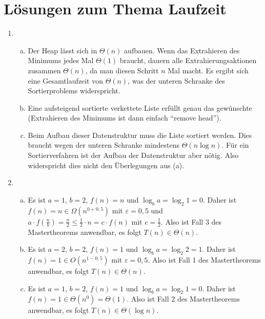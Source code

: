 \documentclass{scrartcl}
\begin{document}
\section*{Lösungen zum Thema Laufzeit}
\begin{enumerate}[(1)]

\item \begin{enumerate}[(a)]
\item Der Heap l\"asst sich in $\Theta(n)$ aufbauen. Wenn das Extrahieren des Minimums jedes Mal $\Theta(1)$ braucht, dauern alle Extrahierungsaktionen zusammen $\Theta(n)$, da man diesen Schritt $n$ Mal macht. Es ergibt sich eine Gesamtlaufzeit von $\Theta(n)$, was der unteren Schranke des Sortierproblems widerspricht.
\item Eine aufsteigend sortierte verkettete Liste erf\"ullt genau das gew\"unschte (Extrahieren des Minimums ist dann einfach "`remove head"').
\item Beim Aufbau dieser Datenstruktur muss die Liste sortiert werden. Dies braucht wegen der unteren Schranke mindestens $\Theta(n\log n)$. F\"ur ein Sortierverfahren ist der Aufbau der Datenstruktur aber n\"otig. Also widerspricht dies nicht den \"Uberlegungen aus (a).
\end{enumerate}

\item \begin{enumerate}[(a)]
\item Es ist $a=1$, $b=2$, $f(n)=n$ und $\log_b a=\log_2 1=0$. Daher ist $f(n)=n\in \Omega(n^{0+0,5})$ mit $\varepsilon = 0,5$ und $a\cdot f(\frac{n}{b})=\frac{n}{2}\leq \frac{1}{2}\cdot n = c\cdot f(n)$ mit $c=\frac{1}{2}$. Also ist Fall 3 des Mastertheorems anwendbar, es folgt $T(n)\in\Theta(n)$.
\item Es ist $a=2$, $b=2$, $f(n)=1$ und $\log_b a=\log_2 2=1$. Daher ist $f(n)=1\in O(n^{1-0,5})$ mit $\varepsilon=0,5$. Also ist Fall 1 des Mastertheorems anwendbar, es folgt $T(n)\in\Theta(n)$.
\item Es ist $a=1$, $b=2$, $f(n)=1$ und $\log_b a=\log_2 1=0$. Daher ist $f(n)=1\in \Theta(n^0)=\Theta(1)$. Also ist Fall 2 des Mastertheorems anwendbar, es folgt $T(n)\in\Theta(\log n)$.
\end{enumerate}


\end{enumerate}
\end{document}
